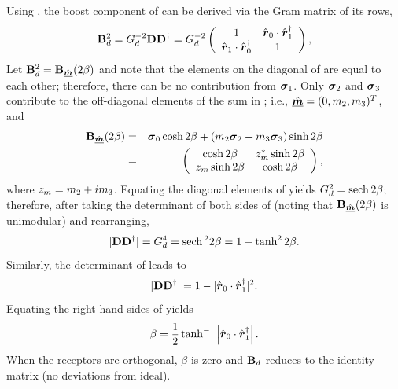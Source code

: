Using , the boost component of 
%
can be derived via the Gram matrix of its rows,
%
\begin{equation}
\label{eqn:nonorthogonal_receptors}
\JM{B}_d^2 = G_d^{-2} \JM{D}\JM{D}^\dagger %
= G_d^{-2} 
  \left( \begin{array}{cc}
1 & \hat{\Jrow{r}}_0\cdot\hat{\Jrow{r}}_1^\dagger \\
\hat{\Jrow{r}}_1 \cdot\hat{\Jrow{r}}_0^\dagger & 1
  \end{array} \right),
\end{equation}
%
Let ${\bf B}_d^2 = {\bf B}_{\hat{\underline{\mbox{\scriptsize\boldmath $m$}}}}(2\beta)$ and note that
%
%
the elements on the diagonal of  are equal to each other; 
%
therefore, there can be no contribution from $\mbox{\boldmath $\sigma$}_{1}$.
Only $\mbox{\boldmath $\sigma$}_{2}$ and $\mbox{\boldmath $\sigma$}_{3}$ contribute to the off-diagonal elements of 
the sum in ; i.e.,
$\hat{\underline{\mbox{\boldmath $m$}}}=(0,m_2,m_3)^T$, and
\begin{eqnarray}
{\bf B}_{\hat{\underline{\mbox{\scriptsize\boldmath $m$}}}}(2\beta) &=& \mbox{\boldmath $\sigma$}_{0}\cosh2\beta + (m_2\mbox{\boldmath $\sigma$}_{2}+m_3\mbox{\boldmath $\sigma$}_{3})\sinh2\beta \nonumber \\
&=& \left( \begin{array}{cc}
\cosh2\beta & z_m^*\sinh2\beta \\
z_m\sinh2\beta & \cosh2\beta
  \end{array} \right),
\label{eqn:nonorthogonal_boost}
\end{eqnarray}
where $z_m = m_2 + i m_3$.
%
Equating the diagonal elements of  
yields $G_d^2 = \mathrm{sech} \, 2\beta$; therefore,
%
after taking the determinant of both sides of  (noting that ${\bf B}_{\hat{\underline{\mbox{\scriptsize\boldmath $m$}}}}(2\beta)$ is unimodular) and rearranging,
%
\begin{equation}
\label{eqn:det_squared_one}
|{\bf D}{\bf D}^\dagger| = G_d^4 = \mathrm{sech} \, ^2 2\beta = 1 - \tanh^2 2\beta. 
\end{equation}
%
Similarly, the determinant of  leads to
%
\begin{equation}
\label{eqn:det_squared_two}
|{\bf D}{\bf D}^\dagger| = 1 - |\hat{\mbox{\boldmath $r$}}_0\cdot\hat{\mbox{\boldmath $r$}}_1^\dagger|^2.
\end{equation}
%
Equating the right-hand sides of  yields
%
\begin{equation}
\label{eqn:nonorthogonal_beta}
\beta = \frac{1}{2}\tanh^{-1} \left|\hat{\mbox{\boldmath $r$}}_0 \cdot \hat{\mbox{\boldmath $r$}}_1^\dagger \right|.
\end{equation}
%
When the receptors are orthogonal, $\beta$ is zero
and ${\bf B}_d$ reduces to the identity matrix (no deviations from ideal).

